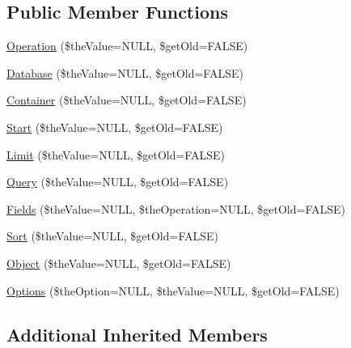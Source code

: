\subsection*{Public Member Functions}
\begin{DoxyCompactItemize}
\item 
\hyperlink{class_c_data_wrapper_client_ae7cad4809c20d8f2871cfe00da909d67}{Operation} (\$the\-Value=N\-U\-L\-L, \$get\-Old=F\-A\-L\-S\-E)
\item 
\hyperlink{class_c_data_wrapper_client_a4cdd14b07d74eeb834d2a6052902f176}{Database} (\$the\-Value=N\-U\-L\-L, \$get\-Old=F\-A\-L\-S\-E)
\item 
\hyperlink{class_c_data_wrapper_client_a6a696f83f580186da02093327a84fe4f}{Container} (\$the\-Value=N\-U\-L\-L, \$get\-Old=F\-A\-L\-S\-E)
\item 
\hyperlink{class_c_data_wrapper_client_ac07a1ae26e12e152090b397b4718c44c}{Start} (\$the\-Value=N\-U\-L\-L, \$get\-Old=F\-A\-L\-S\-E)
\item 
\hyperlink{class_c_data_wrapper_client_add9bd5c550e9ace4b69006b7ce65951a}{Limit} (\$the\-Value=N\-U\-L\-L, \$get\-Old=F\-A\-L\-S\-E)
\item 
\hyperlink{class_c_data_wrapper_client_a81a5e5f23f729bf167c03e6eee4593ed}{Query} (\$the\-Value=N\-U\-L\-L, \$get\-Old=F\-A\-L\-S\-E)
\item 
\hyperlink{class_c_data_wrapper_client_a61d1080dbd1fa5e8b805284a4bfa3581}{Fields} (\$the\-Value=N\-U\-L\-L, \$the\-Operation=N\-U\-L\-L, \$get\-Old=F\-A\-L\-S\-E)
\item 
\hyperlink{class_c_data_wrapper_client_abd1cbfe57fda4734cfd387fd0830272c}{Sort} (\$the\-Value=N\-U\-L\-L, \$get\-Old=F\-A\-L\-S\-E)
\item 
\hyperlink{class_c_data_wrapper_client_ab5a1dd1e3b56468f2748f9e1ecad92fc}{Object} (\$the\-Value=N\-U\-L\-L, \$get\-Old=F\-A\-L\-S\-E)
\item 
\hyperlink{class_c_data_wrapper_client_a5974e65e4ce07b93fc4b44ebffe5e606}{Options} (\$the\-Option=N\-U\-L\-L, \$the\-Value=N\-U\-L\-L, \$get\-Old=F\-A\-L\-S\-E)
\end{DoxyCompactItemize}
\subsection*{Additional Inherited Members}


